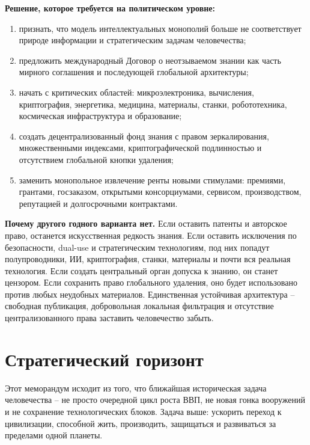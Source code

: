 \documentclass[11pt,a4paper]{article}
\begin{document}
\begin{decisionbox}
\textbf{Решение, которое требуется на политическом уровне:}
\begin{enumerate}
  \item признать, что модель интеллектуальных монополий больше не соответствует природе информации и стратегическим задачам человечества;
  \item предложить международный Договор о неотзываемом знании как часть мирного соглашения и последующей глобальной архитектуры;
  \item начать с критических областей: микроэлектроника, вычисления, криптография, энергетика, медицина, материалы, станки, робототехника, космическая инфраструктура и образование;
  \item создать децентрализованный фонд знания с правом зеркалирования, множественными индексами, криптографической подлинностью и отсутствием глобальной кнопки удаления;
  \item заменить монопольное извлечение ренты новыми стимулами: премиями, грантами, госзаказом, открытыми консорциумами, сервисом, производством, репутацией и долгосрочными контрактами.
\end{enumerate}
\end{decisionbox}

\textbf{Почему другого годного варианта нет.} Если оставить патенты и авторское право, останется искусственная редкость знания. Если оставить исключения по безопасности, dual-use и стратегическим технологиям, под них попадут полупроводники, ИИ, криптография, станки, материалы и почти вся реальная технология. Если создать центральный орган допуска к знанию, он станет цензором. Если сохранить право глобального удаления, оно будет использовано против любых неудобных материалов. Единственная устойчивая архитектура -- свободная публикация, добровольная локальная фильтрация и отсутствие централизованного права заставить человечество забыть.

\section{Стратегический горизонт}

Этот меморандум исходит из того, что ближайшая историческая задача человечества -- не просто очередной цикл роста ВВП, не новая гонка вооружений и не сохранение технологических блоков. Задача выше: ускорить переход к цивилизации, способной жить, производить, защищаться и развиваться за пределами одной планеты.
\end{document}
